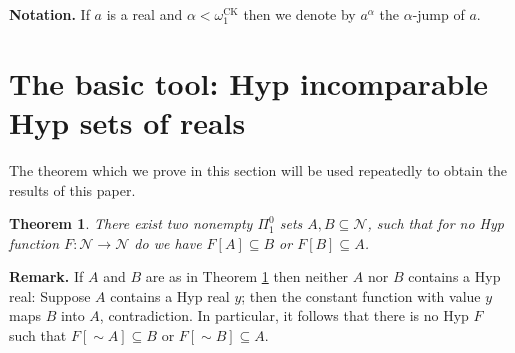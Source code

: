 \documentclass[11pt, english]{article}
\newtheorem{thm}{Theorem}
\DeclareMathOperator{\ck}{CK}
\newcommand{\baire}{\mathscr N}
\begin{document}
\medskip

\noindent \textbf{Notation.} If $a$ is a real and
$\alpha<\omega_1^{\ck}$ then we denote by $a^{\alpha}$ the
$\alpha$-jump of $a$.


\section{The basic tool: Hyp incomparable Hyp sets of reals }

The theorem which we prove in this section will be used repeatedly
to obtain the results of this paper.

\begin{thm}\label{MainThm}
There exist two nonempty $\Pi^0_1$ sets $A,B\subseteq\baire$, such
that for no Hyp function $F:\baire\to\baire$ do we have
$F[A]\subseteq B$ or $F[B]\subseteq A$.
\end{thm}

\noindent \textbf{Remark.} If $A$ and $B$ are as in Theorem
\ref{MainThm} then neither $A$ nor $B$ contains a Hyp real: Suppose
$A$ contains a Hyp real $y$; then the constant function with value
$y$ maps $B$ into $A$, contradiction. In particular, it follows that
there is no Hyp $F$ such that $F[\sim A]\subseteq B$ or $F[\sim
B]\subseteq A$.
\end{document}
